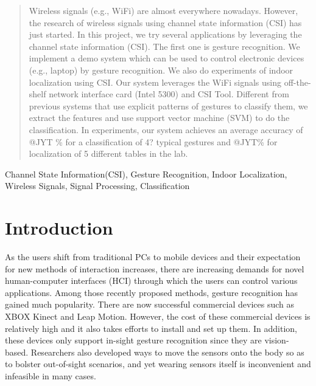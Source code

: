 \documentclass[conference]{IEEEtran}
\begin{document}
\begin{abstract}
Wireless signals (e.g., WiFi) are almost everywhere nowadays. However, the research of wireless signals using channel state information (CSI) has just started.
In this project, we try several applications by leveraging the channel state information (CSI). 
The first one is gesture recognition. We implement a demo system which can be used to control electronic devices (e.g., laptop) by gesture recognition. 
We also do experiments of indoor localization using CSI. 
Our system leverages the WiFi signals using off-the-shelf network interface card (Intel 5300) and CSI Tool.
Different from previous systems that use explicit patterns of gestures to classify them, we extract the features and use support vector machine (SVM) to do the classification.
In experiments, our system achieves an average accuracy of @JYT \% for a classification of 4? typical gestures and @JYT\% for localization of 5 different tables in the lab.

\end{abstract}


\begin{keywords}
Channel State Information(CSI), Gesture Recognition, Indoor Localization, Wireless Signals, Signal Processing, Classification
\end{keywords}


%
\IEEEpeerreviewmaketitle

\section{Introduction}
As the users shift from traditional PCs to mobile devices and their expectation for new methods of interaction increases, there are increasing demands for novel human-computer interfaces (HCI) through which the users can control various applications.
Among those recently proposed methods, gesture recognition has gained much popularity. There are now successful commercial devices such as XBOX Kinect and Leap Motion. 
However, the cost of these commercial devices is relatively high and it also takes efforts to install and set up them.
In addition, these devices only support in-sight gesture recognition since they are vision-based.
Researchers also developed ways to move the sensors onto the body so as to bolster out-of-sight scenarios, and yet wearing sensors itself is inconvenient and infeasible in many cases.
\end{document}

